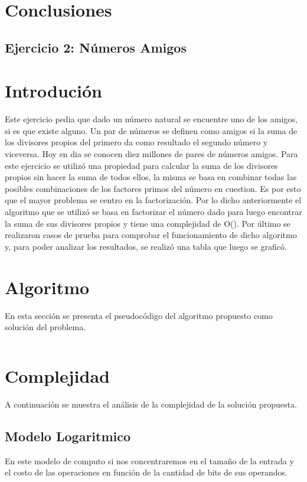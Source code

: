 \documentclass[a4paper, 12pt] {article}
\begin{document}
\section*{Conclusiones}

\newpage

\begin{center}
\section*{Ejercicio 2: N\'umeros Amigos}
\end{center}

\bigskip
\section*{Introduci\'on}
Este ejercicio pedia que dado un n\'umero natural se encuentre uno de los amigos, si es que existe alguno.
Un par de n\'umeros se definen como amigos si la suma de los divisores propios del primero da como resultado el segundo n\'umero y viceversa. Hoy en dia se conocen diez millones de pares de n\'umeros amigos.
Para este ejercicio se utiliz\'o una propiedad para calcular la suma de los divisores propios sin hacer la suma de todos ellos, la misma se basa en combinar todas las posibles combinaciones de los factores primos del n\'umero en cuestion. Es por esto que el mayor problema se centro en la factorizaci\'on.
Por lo dicho anteriormente el algoritmo que se utiliz\'o se basa en factorizar el n\'umero dado para luego encontrar la suma de sus divisores propios y tiene una complejidad de O(). Por \'ultimo se realizaron casos de prueba para comprobar el funcionamiento de dicho algoritmo y, para poder analizar los resultados, se realiz\'o una tabla que luego se grafic\'o. 
\section*{Algoritmo}
En esta secci\'on se presenta el pseudoc\'odigo del algoritmo propuesto como soluci\'on del problema.
\begin{verbatim}
\end{verbatim}

\section*{Complejidad}
A continuaci\'on se muestra el an\'alisis de la complejidad de la soluci\'on propuesta.
\subsection*{Modelo Logaritmico}
En este modelo de computo si nos concentraremos en el tama\~{n}o de la entrada y el costo de las operaciones en funci\'on de la cantidad de bits de sus operandos.
\end{document}
